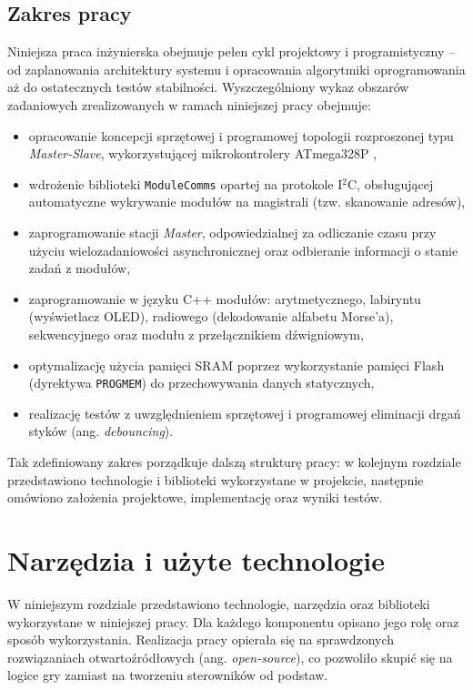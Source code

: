 \documentclass{SGGW-thesis}
\begin{document}
\section{Zakres pracy}
Niniejsza praca inżynierska obejmuje pełen cykl projektowy i programistyczny – od zaplanowania architektury systemu i opracowania algorytmiki oprogramowania aż do ostatecznych testów stabilności. Wyszczególniony wykaz obszarów zadaniowych zrealizowanych w ramach niniejszej pracy obejmuje:
\begin{itemize}
  \item opracowanie koncepcji sprzętowej i programowej topologii rozproszonej typu \textit{Master-Slave}, wykorzystującej mikrokontrolery ATmega328P \cite{atmega328p_datasheet},
  \item wdrożenie biblioteki \texttt{ModuleComms} opartej na protokole I$^2$C, obsługującej automatyczne wykrywanie modułów na magistrali (tzw. skanowanie adresów),
  \item zaprogramowanie stacji \textit{Master}, odpowiedzialnej za odliczanie czasu przy użyciu wielozadaniowości asynchronicznej oraz odbieranie informacji o stanie zadań z modułów,
  \item zaprogramowanie w języku C++ modułów: arytmetycznego, labiryntu (wyświetlacz OLED), radiowego (dekodowanie alfabetu Morse'a), sekwencyjnego oraz modułu z przełącznikiem dźwigniowym,
  \item optymalizację użycia pamięci SRAM poprzez wykorzystanie pamięci Flash (dyrektywa \texttt{PROGMEM}) do przechowywania danych statycznych,
  \item realizację testów z uwzględnieniem sprzętowej i programowej eliminacji drgań styków (ang. \textit{debouncing}).
\end{itemize}

Tak zdefiniowany zakres porządkuje dalszą strukturę pracy: w kolejnym rozdziale przedstawiono technologie i biblioteki wykorzystane w projekcie, następnie omówiono założenia projektowe, implementację oraz wyniki testów.

\chapter{Narzędzia i użyte technologie}
W niniejszym rozdziale przedstawiono technologie, narzędzia oraz biblioteki wykorzystane w niniejszej pracy. Dla każdego komponentu opisano jego rolę oraz sposób wykorzystania. Realizacja pracy opierała się na sprawdzonych rozwiązaniach otwartoźródłowych (ang. \textit{open-source}), co pozwoliło skupić się na logice gry zamiast na tworzeniu sterowników od podstaw.
\end{document}
